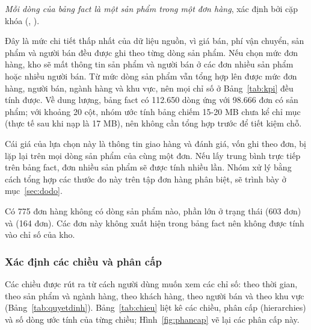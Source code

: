 \begin{center}
\textit{Mỗi dòng của bảng fact là một sản phẩm trong một đơn hàng}, xác định bởi cặp khóa (, ).
\end{center}

Đây là mức chi tiết thấp nhất của dữ liệu nguồn, vì giá bán, phí vận chuyển, sản phẩm và người bán đều được ghi theo từng dòng sản phẩm. Nếu chọn mức đơn hàng, kho sẽ mất thông tin sản phẩm và người bán ở các đơn nhiều sản phẩm hoặc nhiều người bán. Từ mức dòng sản phẩm vẫn tổng hợp lên được mức đơn hàng, người bán, ngành hàng và khu vực, nên mọi chỉ số ở Bảng~\ref{tab:kpi} đều tính được. Về dung lượng, bảng fact có 112.650 dòng ứng với 98.666 đơn có sản phẩm; với khoảng 20 cột, nhóm ước tính bảng chiếm 15-20 MB chưa kể chỉ mục (thực tế sau khi nạp là 17 MB), nên không cần tổng hợp trước để tiết kiệm chỗ.

Cái giá của lựa chọn này là thông tin giao hàng và đánh giá, vốn ghi theo đơn, bị lặp lại trên mọi dòng sản phẩm của cùng một đơn. Nếu lấy trung bình trực tiếp trên bảng fact, đơn nhiều sản phẩm sẽ được tính nhiều lần. Nhóm xử lý bằng cách tổng hợp các thước đo này trên tập đơn hàng phân biệt, sẽ trình bày ở mục~\ref{sec:dodo}.

Có 775 đơn hàng không có dòng sản phẩm nào, phần lớn ở trạng thái  (603 đơn) và  (164 đơn). Các đơn này không xuất hiện trong bảng fact nên không được tính vào chỉ số của kho.

\subsubsection{Xác định các chiều và phân cấp}

Các chiều được rút ra từ cách người dùng muốn xem các chỉ số: theo thời gian, theo sản phẩm và ngành hàng, theo khách hàng, theo người bán và theo khu vực (Bảng~\ref{tab:quyetdinh}). Bảng~\ref{tab:chieu} liệt kê các chiều, phân cấp (hierarchies) và số dòng ước tính của từng chiều; Hình~\ref{fig:phancap} vẽ lại các phân cấp này.

